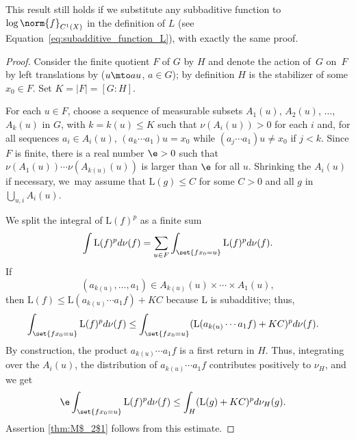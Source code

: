 This result still holds if we substitute any subbaditive function to $ \log\norm{f}_{C^1(X)}$ in the definition of $L$ (see Equation~\ref{eq:subadditive_function_L}), with exactly the same proof.
\begin{proof}
Consider the finite quotient $F$ of $G$ by $H$ and denote the action of~$G$ on~$F$ by left translations by ($u\mto au$, $a\in G$); by definition $H$ is the stabilizer of some $x_0\in F$. Set $K=\vert F\vert = [G: H]$.

For each $u\in F$, choose a sequence of measurable subsets $A_1(u)$, $A_2(u)$, $\ldots$, $A_k(u)$ in $G$, with $k=k(u)\leq K$
such that $\nu(A_i(u))>0$ for each $i$ and, for all sequences $a_i\in A_i(u)$, $(a_k \cdots a_1) u= x_0$
while $(a_j \cdots a_1) u\neq x_0$ if $j<k$. Since $F$ is finite, there is a real
number $\e >0$ such that $\nu(A_1(u))\cdots \nu(A_{k(u)}(u))$ is larger than $\e$ for all $u$. Shrinking the $A_i(u)$ if necessary, we~may assume that $\mathrm L(g)\leq C$ for some $C>0$ and all $g$ in $\bigcup_{u,i}A_i(u)$.

We split the integral of $ \mathrm L(f)^p$ as a finite sum\vspace*{-3pt}
\[
\int \mathrm L(f)^pd\nu(f) = \sum_{u\in F}\int_{\set{fx_0=u }} \mathrm L(f)^pd\nu(f).
\]
If\vspace*{-5pt}
\begin{equation*}
(a_{k(u)}, \ldots, a_1)\in A_{k(u)}(u)\times \cdots \times A_1(u),
\end{equation*}
then $\mathrm L(f)\leq \mathrm L(a_{k(u)} \cdots a_1 f)+K C$ because $\mathrm L$ is subadditive; thus,\vspace*{-3pt}
\begin{align*}
\int_{\set{fx_0=u }} \mathrm L(f)^pd\nu(f) & \leq \int_{\set{fx_0=u }} (\mathrm L(a_{k(u)} \cdots a_1 f)+KC)^pd\nu(f).
\end{align*}
By construction, the product $a_{k(u)} \cdots a_1 f$ is a first return in $H$. Thus,
integrating over the $A_i(u)$, the distribution of $a_{k(u)} \cdots a_1 f$ contributes positively
to $\nu_H$, and we get
\begin{align*}
\e \int_{\set{fx_0=u }} \mathrm L(f)^pd\nu(f) & \leq \int_H (\mathrm L(g)+KC)^pd\nu_H(g).
\end{align*}
Assertion \eqref{thm:M$_2$1} follows from this estimate.


\end{proof}
